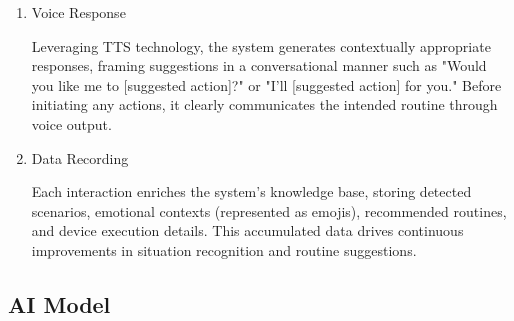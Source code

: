 \documentclass[conference]{IEEEtran}
\begin{document}
\begin{enumerate}[label=\arabic*]
\begin{enumerate}[label=\arabic*)]
        \item Voice Response\par
        \vspace{0.3em}
        Leveraging TTS technology, the system generates contextually appropriate responses, framing suggestions in a conversational manner such as "Would you like me to [suggested action]?" or "I'll [suggested action] for you." Before initiating any actions, it clearly communicates the intended routine through voice output.

        \vspace{0.5em}
        \vspace{0.3em}
        \item Data Recording\par
        Each interaction enriches the system's knowledge base, storing detected scenarios, emotional contexts (represented as emojis), recommended routines, and device execution details. This accumulated data drives continuous improvements in situation recognition and routine suggestions.
        
    \end{enumerate}
\end{enumerate}

\vspace{0.7em} %

\subsection{AI Model}
\vspace{0.5em}
\end{document}
